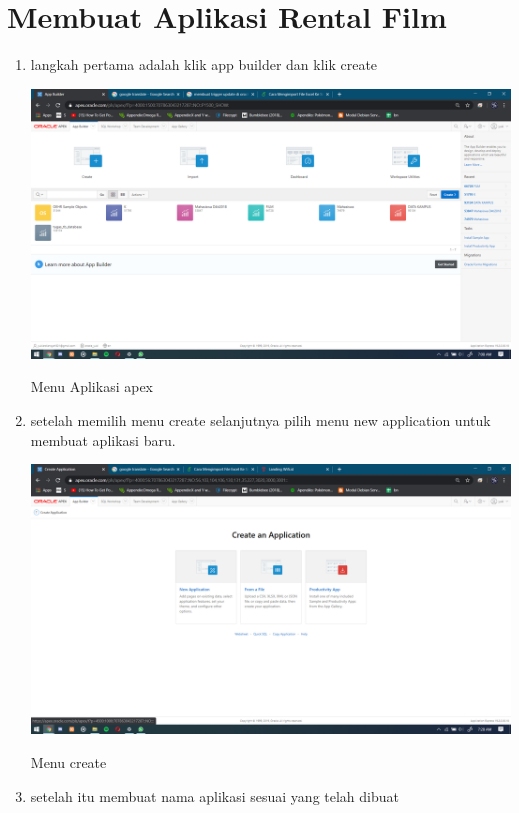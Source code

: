 \documentclass{article}
\begin{document}
\section{Membuat Aplikasi Rental Film}
\begin{enumerate}
    \item langkah pertama adalah klik app builder dan klik create
    
    \begin{center}
         \centering
            \includegraphics[scale=0.27]{figures/0.PNG}
        \caption{Menu Aplikasi apex}
    \end{center}
    
      \item setelah memilih menu create selanjutnya pilih menu new application untuk
membuat aplikasi baru.
    
    \begin{center}
         \centering
            \includegraphics[scale=0.27]{figures/10.PNG}
        \caption{Menu create}
    \end{center}

\item setelah itu membuat nama aplikasi sesuai yang telah dibuat
    

\end{enumerate}
\end{document}
